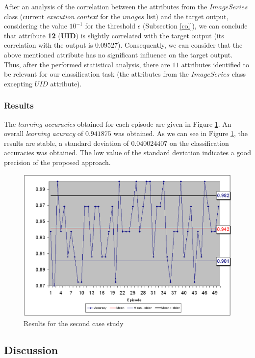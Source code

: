 After an analysis of the correlation between the attributes from the $ImageSeries$ class (current \emph{execution context} for the $images$ list) and the target output, considering the value $10^{-1}$ for the threshold $\epsilon$ (Subsection \ref{col}), we can conclude that attribute \textbf{12} (\textbf{UID}) is slightly correlated with the target output (its correlation with the output is $0.09527$). Consequently, we can consider that the above mentioned attribute has no significant influence on the target output. Thus, after the performed statistical analysis, there are $11$ attributes identified to be relevant for our classification task (the attributes from the $ImageSeries$ class excepting $UID$ attribute). 

\subsubsection{Results}

The \emph{learning accuracies} obtained for each episode are given in Figure \ref{sprec2}. An overall \emph{learning acuracy} of $0.941875$ was obtained. As we can see in Figure \ref{sprec2}, the results are stable, a standard deviation of $0.040024407
$ on the classification accuracies was obtained. The low value of the standard deviation indicates a good precision of the proposed approach.  
  
\begin{figure}[h]
   \centering
       \includegraphics[scale=0.28]{prec2.eps}
              \caption{Results for the second case study}
 \label{sprec2}
\end{figure}


\subsection{Discussion}\label{dis}

